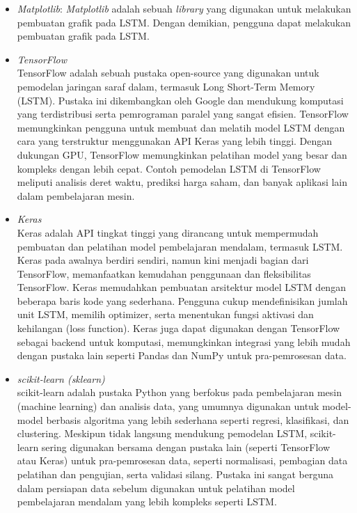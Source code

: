 \begin{subs}
\begin{itemize}
		\item \textit{Matplotlib}: \textit{Matplotlib} adalah sebuah \textit{library} yang digunakan untuk melakukan pembuatan grafik pada LSTM. Dengan demikian, pengguna dapat melakukan pembuatan grafik pada LSTM.
		\item \textit{TensorFlow} \\
		      TensorFlow adalah sebuah pustaka open-source yang digunakan untuk pemodelan jaringan saraf dalam, termasuk Long Short-Term Memory (LSTM). Pustaka ini dikembangkan oleh Google dan mendukung komputasi yang terdistribusi serta pemrograman paralel yang sangat efisien. TensorFlow memungkinkan pengguna untuk membuat dan melatih model LSTM dengan cara yang terstruktur menggunakan API Keras yang lebih tinggi. Dengan dukungan GPU, TensorFlow memungkinkan pelatihan model yang besar dan kompleks dengan lebih cepat. Contoh pemodelan LSTM di TensorFlow meliputi analisis deret waktu, prediksi harga saham, dan banyak aplikasi lain dalam pembelajaran mesin.
		\item \textit{Keras} \\
		      Keras adalah API tingkat tinggi yang dirancang untuk mempermudah pembuatan dan pelatihan model pembelajaran mendalam, termasuk LSTM. Keras pada awalnya berdiri sendiri, namun kini menjadi bagian dari TensorFlow, memanfaatkan kemudahan penggunaan dan fleksibilitas TensorFlow. Keras memudahkan pembuatan arsitektur model LSTM dengan beberapa baris kode yang sederhana. Pengguna cukup mendefinisikan jumlah unit LSTM, memilih optimizer, serta menentukan fungsi aktivasi dan kehilangan (loss function). Keras juga dapat digunakan dengan TensorFlow sebagai backend untuk komputasi, memungkinkan integrasi yang lebih mudah dengan pustaka lain seperti Pandas dan NumPy untuk pra-pemrosesan data.
		\item \textit{scikit-learn (sklearn)} \\
		      scikit-learn adalah pustaka Python yang berfokus pada pembelajaran mesin (machine learning) dan analisis data, yang umumnya digunakan untuk model-model berbasis algoritma yang lebih sederhana seperti regresi, klasifikasi, dan clustering. Meskipun tidak langsung mendukung pemodelan LSTM, scikit-learn sering digunakan bersama dengan pustaka lain (seperti TensorFlow atau Keras) untuk pra-pemrosesan data, seperti normalisasi, pembagian data pelatihan dan pengujian, serta validasi silang. Pustaka ini sangat berguna dalam persiapan data sebelum digunakan untuk pelatihan model pembelajaran mendalam yang lebih kompleks seperti LSTM.
	\end{itemize}
\end{subs}

